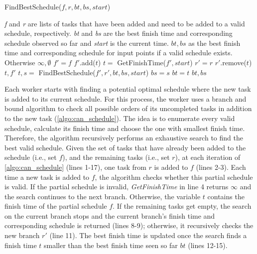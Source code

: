 \begin{algorithm}[!ht]
	\caption{FindBestSchedule($f, r, bt, bs, start$)}
	\label{algo:can_schedule}
	\begin{algorithmic}[1]
		\REQUIRE \emph{f} and \emph{r} are lists of tasks that have been added and need to be added to a valid schedule, respectively. \emph{bt} and \emph{bs} are the best finish time and corresponding schedule observed so far and \emph{start} is the current time.
		\ENSURE $bt, bs$ as the best finish time and corresponding schedule for input points if a valid schedule exists. Otherwise $\infty, \emptyset$
			\STATE $f' = f$
			\STATE $f'$.add($t$)
			\STATE $t =$ GetFinishTime($f', start$)
				\STATE $r' = r$
				\STATE $r'$.remove($t$)
					\RETURN $t, f'$
				\ENDIF
				\STATE $t, s =$ FindBestSchedule($f', r', bt, bs, start$)
					\STATE $bs = s$
					\STATE $bt = t$
				\ENDIF
			\ENDIF
		\ENDFOR
		\RETURN $bt, bs$
	\end{algorithmic} \vspace{-1mm}
\end{algorithm}

Each worker starts with finding a potential optimal schedule where the new task is added to its current schedule. For this process, the worker uses a branch and bound algorithm to check all possible orders of its uncompleted tasks in addition to the new task (\cref{algo:can_schedule}). The idea is to enumerate every valid schedule, calculate its finish time and choose the one with smallest finish time. Therefore, the algorithm recursively performs an exhaustive search to find the best valid schedule. Given the set of tasks that have already been added to the schedule (i.e., set $f$), and the remaining tasks (i.e., set $r$), at each iteration of \cref{algo:can_schedule} (lines 1-17), one task from $r$ is added to $f$ (lines 2-3). Each time a new task is added to $f$, the algorithm checks whether this partial schedule is valid. If the partial schedule is invalid, \textit{GetFinishTime} in line 4 returns $\infty$ and the search continues to the next branch. Otherwise, the variable $t$ contains the finish time of the partial schedule $f$. If the remaining tasks get empty, the search on the current branch stops and the current branch's finish time and corresponding schedule is returned (lines 8-9); otherwise, it recursively checks the new branch $r'$ (line 11). The best finish time is updated once the search finds a finish time $t$ smaller than the best finish time seen so far $bt$ (lines 12-15).\\

